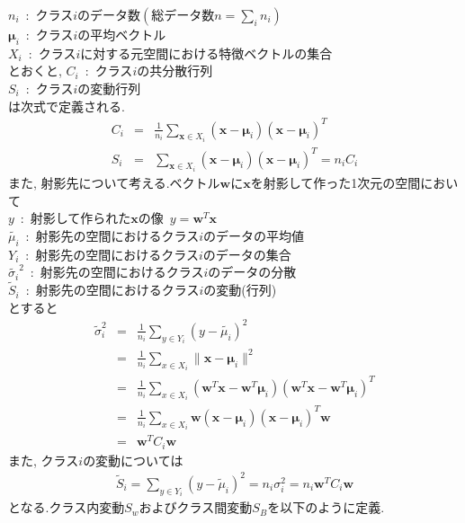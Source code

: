 $n_{i}$\ :\ クラス$i$のデータ数$\displaystyle \left(総データ数 n=\sum_{i}n_{i}\right)$\\
$\bm{\mu}_{i}$\ :\ クラス$i$の平均ベクトル\\
$X_{i}$\ :\ クラス$i$に対する元空間における特徴ベクトルの集合\\
とおくと,
$C_{i}$\ :\ クラス$i$の共分散行列\\
$S_{i}$\ :\ クラス$i$の変動行列\\
は次式で定義される.
\begin{eqnarray*}
    C_{i}&=&\frac{1}{n_{i}}\sum_{\bm{x}\in X_{i}}(\bm{x}-\bm{\mu}_{i})(\bm{x}-\bm{\mu}_{i})^{T}\\
    S_{i}&=&\sum_{\bm{x}\in X_{i}}(\bm{x}-\bm{\mu}_{i})(\bm{x}-\bm{\mu}_{i})^{T}=n_{i}C_{i}
\end{eqnarray*}
また, 射影先について考える.ベクトル$\bm{w}$に$\bm{x}$を射影して作った1次元の空間において\\
$y$\ :\ 射影して作られた$\bm{x}$の像\ $y=\bm{w}^{T}\bm{x}$\\
$\tilde{\mu_{i}}$\  :\ 射影先の空間におけるクラス$i$のデータの平均値\\
$Y_{i}$\ :\ 射影先の空間におけるクラス$i$のデータの集合\\
$\tilde{\sigma_{i}}^{2}$\ :\ 射影先の空間におけるクラス$i$のデータの分散\\
$\tilde{S}_{i}$\ :\ 射影先の空間におけるクラス$i$の変動(行列)\\
とすると
\begin{eqnarray*}
    \tilde{\sigma}_{i}^{2}&=&\frac{1}{n_{i}}\sum_{y\in Y_{i}}(y-\tilde{\mu_{i}})^{2}\\
                          &=&\frac{1}{n_{i}}\sum_{x\in X_{i}}\|\bm{x}-\bm{\mu}_{i}\|^{2}\\
                          &=&\frac{1}{n_{i}}\sum_{x\in X_{i}}(\bm{w}^{T}\bm{x}-\bm{w}^{T}\bm{\mu}_{i})(\bm{w}^{T}\bm{x}-\bm{w}^{T}\bm{\mu}_{i})^{T}\\
                          &=&\frac{1}{n_{i}}\sum_{x\in X_{i}}\bm{w}(\bm{x}-\bm{\mu}_{i})(\bm{x}-\bm{\mu}_{i})^{T}\bm{w}\\
                          &=&\bm{w}^{T}C_{i}\bm{w}
\end{eqnarray*}
また, クラス$i$の変動については
\begin{eqnarray*}
    \tilde{S}_{i}=\sum_{y\in Y_{i}}(y-\tilde{\mu}_{i})^{2}=n_{i}\sigma_{i}^{2}=n_{i}\bm{w}^{T}C_{i}\bm{w}
\end{eqnarray*}
となる.クラス内変動$S_{w}$およびクラス間変動$S_{B}$を以下のように定義.
